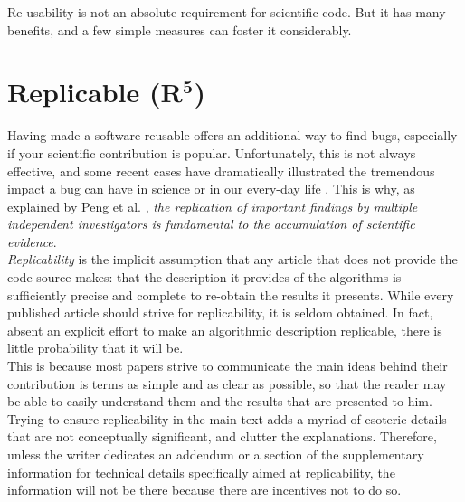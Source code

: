 \documentclass[a4paper,11pt]{article}
\begin{document}
Re-usability is not an absolute requirement for scientific code. But it has many benefits, and a few simple measures can foster it considerably.

\section*{Replicable (R$^{\mathbf 5}$)}

Having made a software reusable offers an additional way to find bugs, especially if your scientific contribution is popular. Unfortunately, this is not always effective, and some recent cases have dramatically illustrated the tremendous impact a bug can have in science
\citep{Eklund:2016} or in our every-day life \citep{Durumeric:2014}. This is
why, as explained by Peng et al. \cite{Peng:2006}, {\em the replication of
  important findings by multiple independent investigators is fundamental to
  the accumulation of scientific evidence}.\\

\emph{Replicability} is the implicit
assumption that any article that does not provide the code source makes: that
the description it provides of the algorithms is sufficiently precise and
complete to re-obtain the results it presents. While every published article
should strive for replicability, it is seldom obtained. In fact, absent an explicit effort to make an algorithmic description replicable, there is little probability that it will be.\\

This is because most papers strive to communicate the main ideas behind their contribution is terms as simple and as clear as possible, so that the reader may be able to easily understand them and the results that are presented to him. Trying to ensure replicability in the main text adds a myriad of esoteric details that are not conceptually significant, and clutter the explanations. Therefore, unless the writer dedicates an addendum or a section of the supplementary information for technical details specifically aimed at replicability, the information will not be there because there are incentives not to do so.\\
\end{document}
